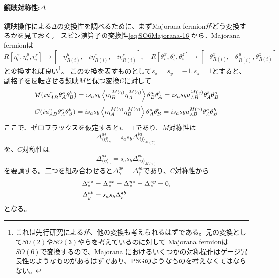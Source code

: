\documentclass[11pt, aps, longbibliography]{article}
\begin{document}
        \paragraph{鏡映対称性:$\Delta$}
        鏡映操作による$\Delta$の変換性を調べるために、まずMajorana fermionがどう変換するかを見ておく。
        スピン演算子の変換性\eqref{eq:SO6Majorana-16}から、Majorana fermionは
        \begin{equation}\label{eq:SO6Majorana-19}
            R[\eta^x_i, \eta^y_i, \eta^z_i] \rightarrow [-\eta_{R(i)}^y, -i\eta_{R(i)}^x, -i\eta_{R(i)}^z], \quad R[\theta_i^x, \theta_i^y, \theta_i^z] \rightarrow [-\theta_{R(i)}^x, -\theta_{R(i)}^y, \theta_{R(i)}^z]
        \end{equation}
        と変換すれば良い\footnote{これは先行研究\cite{PhysRevB.102.075110}によるが、他の変換も考えられるはずである。元の変換として$SU(2)$や$SO(3)$やらを考えているのに対して
        Majorana fermionは$SO(6)$で変換するので、Majorana におけるいくつかの対称操作はゲージ冗長性のようなものがあるはずであり、PSGのようなものを考えなくてはならない。}。
        この変換を表すものとして$s_x=s_y=-1, s_z=1$とすると、
        副格子を反転させる鏡映$M$と保つ変換$C$に対して
        \begin{align}\label{eq:SO6Majorana-20}
            M(iu_{AB}^\gamma \theta_A^a\theta_B^b) = is_as_b\expval{i\eta_{B}^{M(\gamma)}\eta_{A}^{M(\gamma)}} \theta_{B}^a\theta_{A}^b = is_as_bu_{AB}^{M(\gamma)}\theta_A^b \theta_B^a
        \end{align}
        \begin{equation}\label{eq:SO6Majorana-21}
            C(iu_{AB}^\gamma \theta_A^a\theta_B^b) = is_as_b\expval{i\eta_{A}^{M(\gamma)}\eta_{B}^{M(\gamma)}} \theta_{A}^a\theta_{B}^b = is_as_bu_{AB}^{M(\gamma)}\theta_A^a \theta_B^b
        \end{equation}
        ここで、ゼロフラックスを仮定すると$u=1$であり、$M$対称性は
        \begin{equation}\label{eq:SO6Majorana-22}
            \Delta_{\langle ij\rangle_\gamma}^{ab} = s_as_b\Delta_{\langle ij\rangle_{M(\gamma)}}^{ba}
        \end{equation}
        を、$C$対称性は
        \begin{equation}\label{eq:SO6Majorana-23}
            \Delta_{\langle ij\rangle_\gamma}^{ab} = s_as_b\Delta_{\langle ij\rangle_{M(\gamma)}}^{ab}
        \end{equation}
        を要請する。二つを組み合わせると$\Delta_\gamma^{ab}= \Delta_\gamma^{ba} $であり、$C$対称性から
        \begin{align}\label{eq:SO6Majorana-24}
            \Delta_z^{xz} &= \Delta_z^{zx} = \Delta_z^{yz} = \Delta_z^{zy} = 0, \notag \\
            \Delta_y^{ab} &= s_as_b\Delta_x^{ab}
        \end{align}
        となる。
        
\end{document}

